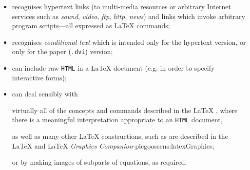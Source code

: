 \begin{itemize}
%
%
%
\item
recognises hypertext links (to multi-media resources or
arbitrary Internet services such as
\textsl{sound}, \textsl{video}, \textsl{ftp}, \textsl{http}, \textsl{news}) and
links which invoke arbitrary program scripts---all expressed as \LaTeX{}
commands;

%
\item
recognises \emph{conditional text}  which is intended only for
the hypertext version, or only for the paper (\texttt{.dvi}) version;\par
%
%
%
\item
can include raw \texttt{HTML} in a \LaTeX{}  document
(e.g. in order to specify interactive forms);

\label{hypcites}%
%
%
\item
can deal sensibly with
%
\begin{changebar}%
virtually all of the concepts and commands described in
the \LaTeX{} ,
where there is a meaningful interpretation appropriate to
an \texttt{HTML} document,
\end{changebar}
as well as many other \LaTeX{} constructions, such as are described in the
\LaTeX{} 
and \LaTeX{} %
{\textit{Graphics Companion}}{\Xy-pic}{goossens:latexGraphics};

%
%
%
%
%
%
\begin{changebar}%
or by making images of subparts of equations, as required.
\end{changebar}


\end{itemize}
